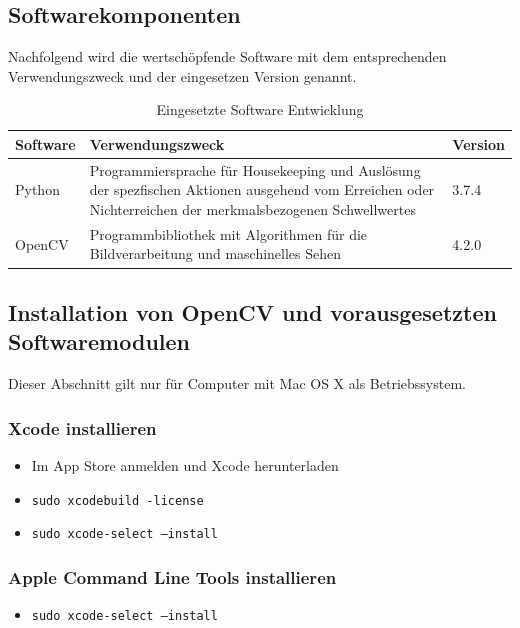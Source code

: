 \subsection{Softwarekomponenten}
Nachfolgend wird die wertschöpfende Software mit dem entsprechenden Verwendungszweck und der eingesetzen Version genannt.
\begin{table}[H]
	
	\begin{tabular}{p{3cm} p{8cm} p{3cm} }
		
		\toprule[1pt]
		\rowcolor{maroon!30}
		
		Software & Verwendungszweck & Version\\
		
		\midrule 
		Python  & Programmiersprache für Housekeeping und Auslösung der spezfischen Aktionen ausgehend vom Erreichen oder Nichterreichen der merkmalsbezogenen Schwellwertes & 3.7.4\\
		OpenCV &  Programmbibliothek mit Algorithmen für die Bildverarbeitung und maschinelles Sehen & 4.2.0 \\ 		

		\bottomrule
	\end{tabular}
	\caption{Eingesetzte Software Entwicklung}
	\label{fig: Eingesetzte Software Entwicklung}
\end{table}

\subsection{Installation von OpenCV und vorausgesetzten Softwaremodulen}
Dieser Abschnitt gilt nur für Computer mit Mac OS X als Betriebssystem.
\subsubsection{Xcode installieren} 
\begin{itemize}
	\item Im App Store anmelden und Xcode herunterladen
	\item \texttt{sudo xcodebuild -license}
	\item \texttt{sudo xcode-select --install}
\end{itemize}

\subsubsection{Apple Command Line Tools installieren} 
\begin{itemize}
	\item \texttt{sudo xcode-select --install}
\end{itemize}

